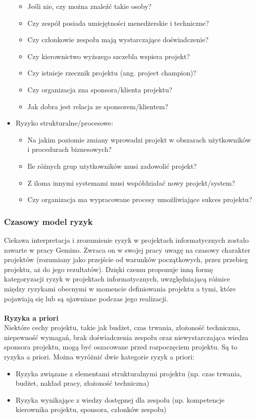 \begin{itemize}
\begin{itemize}
        \item Jeśli nie, czy można znaleźć takie osoby?
        \item Czy zespół posiada umiejętności menedżerskie i techniczne?
        \item Czy członkowie zespołu mają wystarczające doświadczenie?
        \item Czy kierownictwo wyższego szczebla wspiera projekt?
        \item Czy istnieje rzecznik projektu (ang. project champion)?
        \item Czy organizacja zna sponsora/klienta projektu?
        \item Jak dobra jest relacja ze sponsorem/klientem?
    \end{itemize}
    \item Ryzyko strukturalne/procesowe:
    \begin{itemize}
        \item Na jakim poziomie zmiany wprowadzi projekt w obszarach użytkowników i procedurach biznesowych?
        \item Ile różnych grup użytkowników musi zadowolić projekt?
        \item Z iloma innymi systemami musi współdziałać nowy projekt/system?
        \item Czy organizacja ma wypracowane procesy umożliwiające sukces projektu?
    \end{itemize}
\end{itemize}

\subsubsection{Czasowy model ryzyk}
Ciekawa interpretacja i zrozumienie ryzyk w projektach informatycznych zostało zawarte w pracy Gemino.\autocite{ryzyka} Zwraca on w swojej pracy uwagę na czasowy charakter projektów (rozumiany jako przejście od warunków początkowych, przez przebieg projektu, aż do jego rezultatów). Dzięki czemu proponuje inną formę kategoryzacji ryzyk w projektach informatycznych, uwzględniającą różnice między ryzykami obecnymi w momencie definiowania projektu a tymi, które pojawiają się lub są ujawniane podczas jego realizacji.
\\
\\
\textbf{Ryzyka a priori}\\
Niektóre cechy projektu, takie jak budżet, czas trwania, złożoność techniczna, niepewność wymagań, brak doświadczenia zespołu oraz niewystarczająca wiedza sponsora projektu, mogą być oszacowane przed rozpoczęciem projektu. Są to ryzyka a priori.
Można wyróżnić dwie kategorie ryzyk a priori:
\begin{itemize}
    \item Ryzyka związane z elementami strukturalnymi projektu (np. czas trwania, budżet, nakład pracy, złożoność techniczna)
    \item Ryzyka wynikające z wiedzy dostępnej dla zespołu (np. kompetencje kierownika projektu, sponsora, członków zespołu)
\end{itemize}

